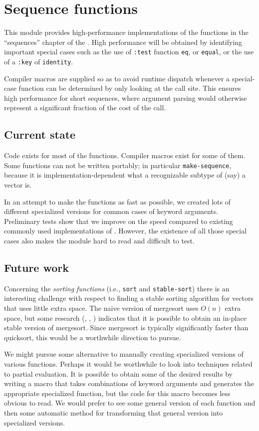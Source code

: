 \chapter{Sequence functions}

This module provides high-performance implementations of the
functions in the ``sequences'' chapter of the \hs{}.  High
performance will be obtained by identifying important special cases
such as the use of \texttt{:test} function \texttt{eq}, or
\texttt{equal}, or the use of a \texttt{:key} of \texttt{identity}. 

Compiler macros are supplied so as to avoid runtime dispatch
whenever a special-case function can be determined by only looking at
the call site.  This ensures high performance for short sequences,
where argument parsing would otherwise represent a significant
fraction of the cost of the call.

\section{Current state}

Code exists for most of the functions.  Compiler macros exist for some
of them.  Some functions can not be written portably; in particular
\texttt{make-sequence}, because it is implementation-dependent what a
recognizable subtype of (say) a vector is.

In an attempt to make the functions as fast as possible, we created
lots of different specialized versions for common cases of keyword
arguments.  Preliminary tests show that we improve on the speed
compared to existing commonly used implementations of \cl{}.  However,
the existence of all those special cases also makes the module hard to
read and difficult to test.  

\section{Future work}

Concerning the \emph{sorting functions} (i.e., \texttt{sort} and
\texttt{stable-sort}) there is an interesting challenge with respect
to finding a stable sorting algorithm for vectors that uses little
extra space.  The naive version of mergesort uses $O(n)$ extra space,
but some research (\cite{Huang:1990:FSM:898863},
\cite{Huang:1988:PIM:42392.42403},
\cite{Katajainen:1996:PIM:642136.642138}) indicates that it is
possible to obtain an in-place stable version of mergesort.   Since
mergesort is typically significantly faster than quicksort, this would
be a worthwhile direction to pursue.

We might pursue some alternative to manually creating specialized
versions of various functions.  Perhaps it would be worthwhile to look
into techniques related to partial evaluation.  It is possible to
obtain some of the desired results by writing a macro that takes
combinations of keyword arguments and generates the appropriate
specialized function, but the code for this macro becomes less obvious
to read.  We would prefer to see some general version of each function
and then some automatic method for transforming that general version
into specialized versions.  


